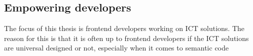 







\subsection{Empowering developers}
The focus of this thesis is frontend developers working on ICT solutions. The reason for this is that it is often up to frontend developers if the ICT solutions are universal designed or not, especially when it comes to semantic code 

